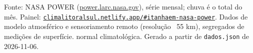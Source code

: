 \documentclass[10pt,a4paper]{article}
\begin{document}
\vspace{1pt}
{\tiny\color{cinza}
Fonte: NASA POWER (\href{https://power.larc.nasa.gov}{power.larc.nasa.gov}), série mensal;
chuva é o total do mês. Painel:
\href{https://climalitoralsul.netlify.app/\#itanhaem-nasa-power}%
{\texttt{climalitoralsul.netlify.app/\#itanhaem-nasa-power}}.
Dados de modelo atmosférico e sensoriamento remoto (resolução ~55 km), segregados de medições de superfície. 
normal climatológica.
Gerado a partir de \texttt{dados.json} de 2026-11-06.}
\end{document}
